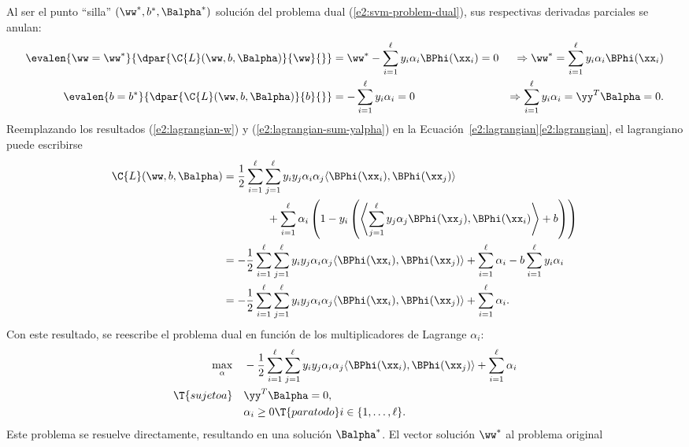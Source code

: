 Al ser el punto ``silla'' $(\ww^*,b^*,\Balpha^*)$ solución del
problema dual (\ref{e2:svm-problem-dual}), sus respectivas derivadas
parciales se anulan:
%
\begin{align}\label{e2:lagrangian-w}
  \evalen{\ww=\ww^*}{\dpar{\C{L}(\ww,b,\Balpha)}{\ww}{}}
    &=\ww^*-\sum_{i=1}^\ell y_i\alpha_i\BPhi(\xx_i) = 0
    &\Rightarrow \ww^* = \sum_{i=1}^\ell y_i\alpha_i\BPhi(\xx_i)
  \\
  \label{e2:lagrangian-sum-yalpha}
  \evalen{b=b^*}{\dpar{\C{L}(\ww,b,\Balpha)}{b}{}}
    &=-\sum_{i=1}^\ell y_i\alpha_i = 0
      &\Rightarrow \sum_{i=1}^\ell y_i\alpha_i = \yy^T\Balpha = 0.
\end{align}
%
Reemplazando los resultados (\ref{e2:lagrangian-w}) y
(\ref{e2:lagrangian-sum-yalpha}) en la
\iflatexml{}Ecuación~\ref{e2:lagrangian}\else\autoref{e2:lagrangian}\fi,
el lagrangiano puede escribirse
%
\begin{align*}
  \C{L}(\ww,b,\Balpha)
  & = 
    \frac{1}{2}\sum_{i=1}^\ell\sum_{j=1}^\ell y_iy_j\alpha_i\alpha_j
    \langle\BPhi(\xx_i),\BPhi(\xx_j)\rangle \\
    &\qquad\qquad +
    \sum_{i=1}^{\ell} \alpha_i \left(1-y_i\left(\left\langle
    \sum_{j=1}^\ell y_j\alpha_j\BPhi(\xx_j) ,\BPhi(\xx_i)\right\rangle
    +b\right)\right)\\
  & = 
    -\frac{1}{2}\sum_{i=1}^\ell\sum_{j=1}^\ell y_iy_j\alpha_i\alpha_j
    \langle\BPhi(\xx_i),\BPhi(\xx_j)\rangle +
    \sum_{i=1}^{\ell} \alpha_i  - b \sum_{i=1}^\ell y_i\alpha_i \\
 & = 
    -\frac{1}{2}\sum_{i=1}^\ell\sum_{j=1}^\ell y_iy_j\alpha_i\alpha_j
    \langle\BPhi(\xx_i),\BPhi(\xx_j)\rangle +
    \sum_{i=1}^{\ell} \alpha_i  .
\end{align*}
%
Con este resultado, se reescribe el problema dual en función de los
multiplicadores de Lagrange $\alpha_i$:
%
\begin{align}
  \begin{split}
    \max_\alpha &\quad
    -\frac{1}{2}\sum_{i=1}^\ell\sum_{j=1}^\ell y_iy_j\alpha_i\alpha_j
    \langle \BPhi(\xx_i),\BPhi(\xx_j) \rangle +
    \sum_{i=1}^{\ell} \alpha_i \\
    \T{sujeto a} &\quad \yy^T\Balpha = 0, \\
    &\quad \alpha_i \geq 0\T{ para todo } i\in\{1,\ldots,\ell\}.
  \end{split}
  \label{e2:svm-problem-dual2}
\end{align}
%
Este problema se resuelve directamente, resultando en una solución
$\Balpha^*$.  El vector solución $\ww^*$ al problema original
